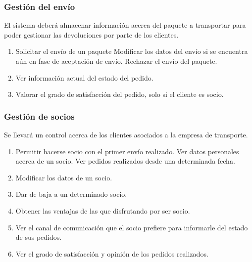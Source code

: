 \subsubsection{Gestión del envío}	
El sistema deberá almacenar información acerca del paquete a transportar para poder gestionar las devoluciones por parte de los clientes. 
\begin{enumerate}
	\item Solicitar el envío de un paquete
	\subitem Modificar los datos del envío si se encuentra aún en fase de aceptación de envío.
	\subitem Rechazar el envío del paquete.
	\item Ver información actual del estado del pedido.	
	\item Valorar el grado de satisfacción del pedido, solo si el cliente es socio.
	
\end{enumerate}

\subsubsection{Gestión de socios}
Se llevará un control acerca de los clientes asociados a la empresa de transporte.
\begin{enumerate}
	\item Permitir hacerse socio con el primer envío realizado.
	\subitem Ver datos personales acerca de un socio.
	\subitem Ver pedidos realizados desde una determinada fecha.
	\item Modificar los datos de un socio.
	\item Dar de baja a un determinado socio.
	\item Obtener las ventajas de las que disfrutando por ser socio.
	\item Ver el canal de comunicación que el socio prefiere para informarle del estado de sus pedidos.
	\item Ver el grado de satisfacción y opinión de los pedidos realizados.
	
\end{enumerate}

